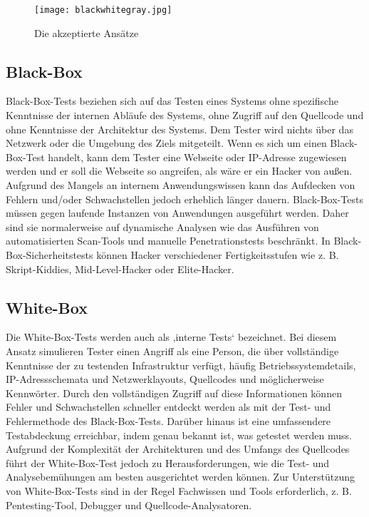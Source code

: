 \begin{figure}[h]
	\centering
	\texttt{[image: blackwhitegray.jpg]}
	\caption{Die akzeptierte Ansätze\cite{bwgtesting16}}
\end{figure}

\subsection{Black-Box}

Black-Box-Tests beziehen sich auf das Testen eines Systems ohne spezifische Kenntnisse der internen Abläufe des Systems, ohne Zugriff auf den Quellcode und ohne Kenntnisse der Architektur des Systems\cite{bwgwebtesting07}. Dem Tester wird nichts über das Netzwerk oder die Umgebung des Ziels mitgeteilt\cite{tiller2004ethical}. Wenn es sich um einen Black-Box-Test handelt, kann dem Tester eine Webseite oder IP-Adresse zugewiesen werden und er soll die Webseite so angreifen, als wäre er ein Hacker von außen\cite{whitaker2005penetration}. Aufgrund des Mangels an internem Anwendungswissen kann das Aufdecken von Fehlern und/oder Schwachstellen jedoch erheblich länger dauern. Black-Box-Tests müssen gegen laufende Instanzen von Anwendungen ausgeführt werden. Daher sind sie normalerweise auf dynamische Analysen wie das Ausführen von automatisierten Scan-Tools und manuelle Penetrationstests beschränkt\cite{bwgwebtesting07}. In Black-Box-Sicherheitstests können Hacker verschiedener Fertigkeitsstufen wie z. B. Skript-Kiddies, Mid-Level-Hacker oder Elite-Hacker\cite{bwgprole18}.

\subsection{White-Box}

Die White-Box-Tests werden auch als ‚interne Tests‘ bezeichnet. Bei diesem Ansatz simulieren Tester einen Angriff als eine Person, die über vollständige Kenntnisse der zu testenden Infrastruktur verfügt, häufig Betriebssystemdetails, IP-Adressschemata und Netzwerklayouts, Quellcodes und möglicherweise Kennwörter\cite{ali2011pt}. Durch den vollständigen Zugriff auf diese Informationen können Fehler und Schwachstellen schneller entdeckt werden als mit der Test- und Fehlermethode des Black-Box-Tests. Darüber hinaus ist eine umfassendere Testabdeckung erreichbar, indem genau bekannt ist, was getestet werden muss. Aufgrund der Komplexität der Architekturen und des Umfangs des Quellcodes führt der White-Box-Test jedoch zu Herausforderungen, wie die Test- und Analysebemühungen am besten ausgerichtet werden können. Zur Unterstützung von White-Box-Tests sind in der Regel Fachwissen und Tools erforderlich, z. B. Pentesting-Tool, Debugger und Quellcode-Analysatoren\cite{bwgwebtesting07}.

